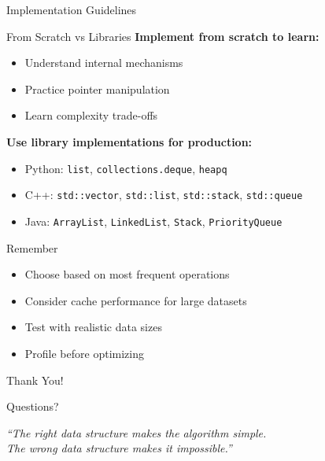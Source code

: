 \documentclass[aspectratio=169,xcolor=dvipsnames]{beamer}
\begin{document}
\begin{frame}{Implementation Guidelines}
  \begin{block}{From Scratch vs Libraries}
    \textbf{Implement from scratch to learn:}
    \begin{itemize}
      \item Understand internal mechanisms
      \item Practice pointer manipulation
      \item Learn complexity trade-offs
    \end{itemize}

    \vspace{0.3cm}

    \textbf{Use library implementations for production:}
    \begin{itemize}
      \item Python: \texttt{list}, \texttt{collections.deque}, \texttt{heapq}
      \item C++: \texttt{std::vector}, \texttt{std::list}, \texttt{std::stack}, \texttt{std::queue}
      \item Java: \texttt{ArrayList}, \texttt{LinkedList}, \texttt{Stack}, \texttt{PriorityQueue}
    \end{itemize}
  \end{block}

  \vspace{0.3cm}

  \begin{alertblock}{Remember}
    \begin{itemize}
      \item Choose based on most frequent operations
      \item Consider cache performance for large datasets
      \item Test with realistic data sizes
      \item Profile before optimizing
    \end{itemize}
  \end{alertblock}
\end{frame}

\begin{frame}[plain]
  \begin{center}
    {\Huge Thank You!}

    \vspace{1cm}

    {\large Questions?}

    \vspace{1cm}

    \textit{``The right data structure makes the algorithm simple.\\
    The wrong data structure makes it impossible.''}
  \end{center}
\end{frame}
\end{document}
